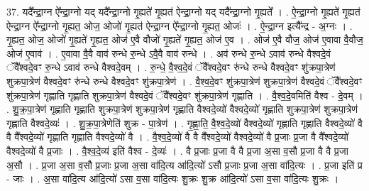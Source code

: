 \documentclass[17pt]{extarticle}
\begin{document}
37. यदै᳚न्द्रा॒ग्न ऐ᳚न्द्रा॒ग्नो यद् यदै᳚न्द्रा॒ग्नो गृ॒ह्यते॑ गृ॒ह्यत॑ ऐन्द्रा॒ग्नो यद् यदै᳚न्द्रा॒ग्नो गृ॒ह्यते᳚ । . ऐ॒न्द्रा॒ग्नो गृ॒ह्यते॑ गृ॒ह्यत॑ ऐन्द्रा॒ग्न ऐ᳚न्द्रा॒ग्नो गृ॒ह्यत॒ ओज॒ ओजो॑ गृ॒ह्यत॑ ऐन्द्रा॒ग्न ऐ᳚न्द्रा॒ग्नो गृ॒ह्यत॒ ओजः॑ । . ऐ॒न्द्रा॒ग्न इत्यै᳚न्द्र - अ॒ग्नः । . गृ॒ह्यत॒ ओज॒ ओजो॑ गृ॒ह्यते॑ गृ॒ह्यत॒ ओज॑ ए॒वै वौजो॑ गृ॒ह्यते॑ गृ॒ह्यत॒ ओज॑ ए॒व । . ओज॑ ए॒वै वौज॒ ओज॑ ए॒वावा वै॒वौज॒ ओज॑ ए॒वाव॑ । . ए॒वावा वै॒वै वाव॑ रुन्धे रु॒न्धे ऽवै॒वै वाव॑ रुन्धे । . अव॑ रुन्धे रु॒न्धे ऽवाव॑ रुन्धे वैश्वदे॒वं ॅवै᳚श्वदे॒वꣳ रु॒न्धे ऽवाव॑ रुन्धे वैश्वदे॒वम् । . रु॒न्धे॒ वै॒श्व॒दे॒वं ॅवै᳚श्वदे॒वꣳ रु॑न्धे रुन्धे वैश्वदे॒वꣳ शु॑क्रपा॒त्रेण॑ शुक्रपा॒त्रेण॑ वैश्वदे॒वꣳ रु॑न्धे रुन्धे वैश्वदे॒वꣳ शु॑क्रपा॒त्रेण॑ । . वै॒श्व॒दे॒वꣳ शु॑क्रपा॒त्रेण॑ शुक्रपा॒त्रेण॑ वैश्वदे॒वं ॅवै᳚श्वदे॒वꣳ शु॑क्रपा॒त्रेण॑ गृह्णाति गृह्णाति शुक्रपा॒त्रेण॑ वैश्वदे॒वं ॅवै᳚श्वदे॒वꣳ शु॑क्रपा॒त्रेण॑ गृह्णाति । . वै॒श्व॒दे॒वमिति॑ वैश्व - दे॒वम् । . शु॒क्र॒पा॒त्रेण॑ गृह्णाति गृह्णाति शुक्रपा॒त्रेण॑ शुक्रपा॒त्रेण॑ गृह्णाति वैश्वदे॒व्यो॑ वैश्वदे॒व्यो॑ गृह्णाति शुक्रपा॒त्रेण॑ शुक्रपा॒त्रेण॑ गृह्णाति वैश्वदे॒व्यः॑ । . शु॒क्र॒पा॒त्रेणेति॑ शुक्र - पा॒त्रेण॑ । . गृ॒ह्णा॒ति॒ वै॒श्व॒दे॒व्यो॑ वैश्वदे॒व्यो॑ गृह्णाति गृह्णाति वैश्वदे॒व्यो॑ वै वै वै᳚श्वदे॒व्यो॑ गृह्णाति गृह्णाति वैश्वदे॒व्यो॑ वै । . वै॒श्व॒दे॒व्यो॑ वै वै वै᳚श्वदे॒व्यो॑ वैश्वदे॒व्यो॑ वै प्र॒जाः प्र॒जा वै वै᳚श्वदे॒व्यो॑ वैश्वदे॒व्यो॑ वै प्र॒जाः । . वै॒श्व॒दे॒व्य॑ इति॑ वैश्व - दे॒व्यः॑ । . वै प्र॒जाः प्र॒जा वै वै प्र॒जा अ॒सा व॒सौ प्र॒जा वै वै प्र॒जा अ॒सौ । . प्र॒जा अ॒सा व॒सौ प्र॒जाः प्र॒जा अ॒सा वा॑दि॒त्य आ॑दि॒त्यो॑ ऽसौ प्र॒जाः प्र॒जा अ॒सा वा॑दि॒त्यः । . प्र॒जा इति॑ प्र - जाः । . अ॒सा वा॑दि॒त्य आ॑दि॒त्यो॑ ऽसा व॒सा वा॑दि॒त्यः शु॒क्रः शु॒क्र आ॑दि॒त्यो॑ ऽसा व॒सा वा॑दि॒त्यः शु॒क्रः । \newline
\end{document}
